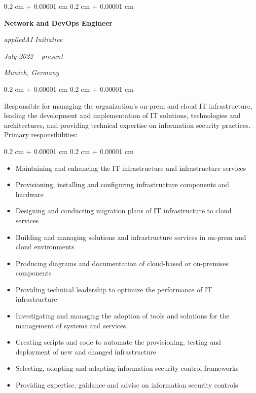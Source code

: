 \documentclass[10pt, a4paper]{article}
\newenvironment{highlights}{
    \begin{itemize}[
        topsep=0.10 cm,
        parsep=0.10 cm,
        partopsep=0pt,
        itemsep=0pt,
        leftmargin=0.4 cm + 10pt
    ]
}{
    \end{itemize}
} %
\newenvironment{onecolentry}{
    \begin{adjustwidth}{
        0.2 cm + 0.00001 cm
    }{
        0.2 cm + 0.00001 cm
    }
}{
    \end{adjustwidth}
} %
\newenvironment{twocolentry}[2][]{
    \onecolentry
    \def\secondColumn{#2}
    \setcolumnwidth{\fill, 4.5 cm}
    \begin{paracol}{2}
}{
    \switchcolumn \raggedleft \secondColumn
    \end{paracol}
    \endonecolentry
} %
\begin{document}
        
        \begin{twocolentry}{
        \textit{July 2022 – present}


        \textit{Munich, Germany}}
            \large\textbf{Network and DevOps Engineer}
            
            \textit{appliedAI Initiative}
        \end{twocolentry}

        \vspace{0.10 cm}

        \begin{onecolentry}
        Responsible for managing the organization’s on-prem and cloud IT infrastructure, leading the development and implementation of IT solutions, technologies and architectures, and providing technical expertise on information security practices. Primary responsibilities:
        \end{onecolentry}

        \vspace{0.10 cm}

        \begin{onecolentry}
            \begin{highlights}
                \item Maintaining and enhancing the IT infrastructure and infrastructure services
                \item Provisioning, installing and configuring infrastructure components and hardware
                \item Designing and conducting migration plans of IT infrastructure to cloud services
                \item Building and managing solutions and infrastructure services in on-prem and cloud environments
                \item Producing diagrams and documentation of cloud-based or on-premises components
                \item Providing technical leadership to optimize the performance of IT infrastructure
                \item Investigating and managing the adoption of tools and solutions for the management of systems and services
                \item Creating scripts and code to automate the provisioning, testing and deployment of new and changed infrastructure
                \item Selecting, adopting and adapting information security control frameworks
                \item Providing expertise, guidance and advise on information security controls
            \end{highlights}
        \end{onecolentry}
\end{document}
